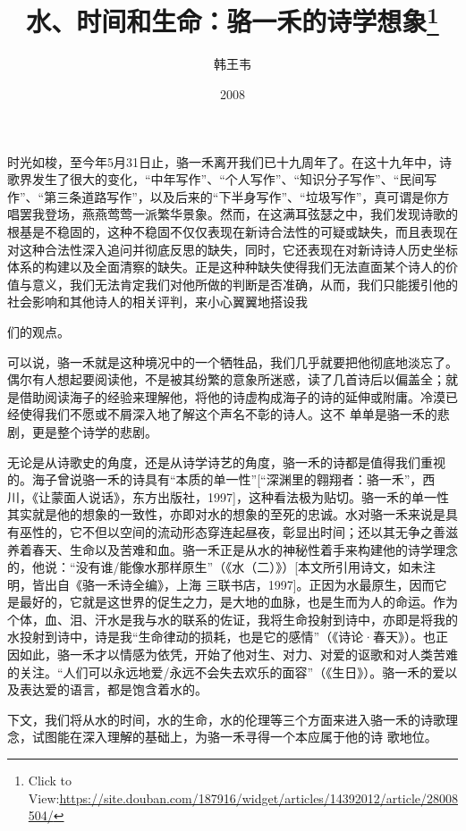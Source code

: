 \documentclass{article}
\title{水、时间和生命：骆一禾的诗学想象\footnote{Click to View:\url{https://site.douban.com/187916/widget/articles/14392012/article/28008504/}}}
\author{韩王韦}
\date{2008}
\begin{document}

\maketitle


\Large

﻿时光如梭，至今年5月31日止，骆一禾离开我们已十九周年了。在这十九年中，诗歌界发生了很大的变化，“中年写作”、“个人写作”、“知识分子写作”、“民间写作”、“第三条道路写作”，以及后来的“下半身写作”、“垃圾写作”，真可谓是你方唱罢我登场，燕燕莺莺一派繁华景象。然而，在这满耳弦瑟之中，我们发现诗歌的根基是不稳固的，这种不稳固不仅仅表现在新诗合法性的可疑或缺失，而且表现在对这种合法性深入追问并彻底反思的缺失，同时，它还表现在对新诗诗人历史坐标体系的构建以及全面清察的缺失。正是这种种缺失使得我们无法直面某个诗人的价值与意义，我们无法肯定我们对他所做的判断是否准确，从而，我们只能援引他的社会影响和其他诗人的相关评判，来小心翼翼地搭设我

\newpage
们的观点。 

可以说，骆一禾就是这种境况中的一个牺牲品，我们几乎就要把他彻底地淡忘了。偶尔有人想起要阅读他，不是被其纷繁的意象所迷惑，读了几首诗后以偏盖全；就是借助阅读海子的经验来理解他，将他的诗虚构成海子的诗的延伸或附庸。冷漠已经使得我们不愿或不屑深入地了解这个声名不彰的诗人。这不
单单是骆一禾的悲剧，更是整个诗学的悲剧。 

无论是从诗歌史的角度，还是从诗学诗艺的角度，骆一禾的诗都是值得我们重视的。海子曾说骆一禾的诗具有“本质的单一性”[“深渊里的翱翔者：骆一禾”，西川，《让蒙面人说话》，东方出版社，1997]，这种看法极为贴切。骆一禾的单一性其实就是他的想象的一致性，亦即对水的想象的至死的忠诚。水对骆一禾来说是具有巫性的，它不但以空间的流动形态穿连起昼夜，彰显出时间；还以其无争之善滋养着春天、生命以及苦难和血。骆一禾正是从水的神秘性着手来构建他的诗学理念的，他说：“没有谁/能像水那样原生”（《水（二）》）[本文所引用诗文，如未注明，皆出自《骆一禾诗全编》，上海
\newpage
三联书店，1997]。正因为水最原生，因而它是最好的，它就是这世界的促生之力，是大地的血脉，也是生而为人的命运。作为个体，血、泪、汗水是我与水的联系的佐证，我将生命投射到诗中，亦即是将我的水投射到诗中，诗是我“生命律动的损耗，也是它的感情”（《诗论·春天》）。也正因如此，骆一禾才以情感为依凭，开始了他对生、对力、对爱的讴歌和对人类苦难的关注。“人们可以永远地爱/永远不会失去欢乐的面容”（《生日》）。骆一禾的爱以
及表达爱的语言，都是饱含着水的。 

下文，我们将从水的时间，水的生命，水的伦理等三个方面来进入骆一禾的诗歌理念，试图能在深入理解的基础上，为骆一禾寻得一个本应属于他的诗
歌地位。 
\end{document}
